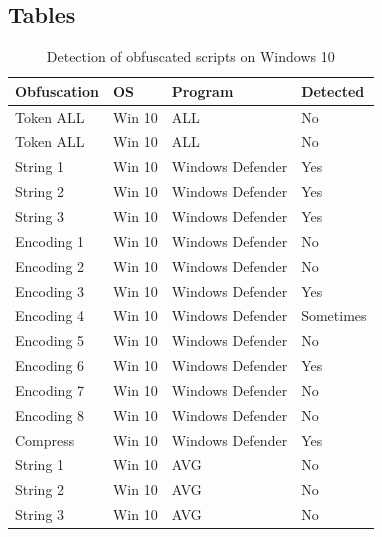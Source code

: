 \documentclass{article}%
\begin{document}
\subsection{Tables}
\begin{table}[]
\caption {Detection of obfuscated scripts on Windows 10} \label{tab:table_one}
\begin{center}
\begin{tabular}{|l|l|l|l|}
\hline
\textbf{Obfuscation} & \textbf{OS} & \textbf{Program} & \textbf{Detected} \\ \hline
Token ALL            & Win 10      & ALL              & No                \\ \hline
Token ALL            & Win 10      & ALL              & No                \\ \hline
String 1             & Win 10      & Windows Defender & Yes               \\ \hline
String 2             & Win 10      & Windows Defender & Yes               \\ \hline
String 3             & Win 10      & Windows Defender & Yes               \\ \hline
Encoding 1           & Win 10      & Windows Defender & No                \\ \hline
Encoding 2           & Win 10      & Windows Defender & No                \\ \hline
Encoding 3           & Win 10      & Windows Defender & Yes               \\ \hline
Encoding 4           & Win 10      & Windows Defender & Sometimes         \\ \hline
Encoding 5           & Win 10      & Windows Defender & No                \\ \hline
Encoding 6           & Win 10      & Windows Defender & Yes               \\ \hline
Encoding 7           & Win 10      & Windows Defender & No                \\ \hline
Encoding 8           & Win 10      & Windows Defender & No                \\ \hline
Compress             & Win 10      & Windows Defender & Yes               \\ \hline
String 1             & Win 10      & AVG              & No                \\ \hline
String 2             & Win 10      & AVG              & No                \\ \hline
String 3             & Win 10      & AVG              & No                \\ \hline

\end{tabular}
\end{center}
\end{table}
\end{document}
